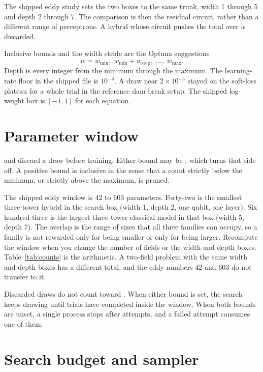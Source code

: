 The shipped eddy study sets the two boxes to the same trunk, width 1 through 5 and depth 2 through 7.
The comparison is then the residual circuit, rather than a different range of perceptrons.
A hybrid whose circuit pushes the total over  is discarded.

Inclusive bounds and the width stride are the Optuna suggestions
\[
w = w_{\min},\; w_{\min}+w_{\mathrm{step}},\; \ldots,\; w_{\max}.
\]
Depth is every integer from the minimum through the maximum.
The learning-rate floor in the shipped file is \(10^{-4}\).
A draw near \(2\times 10^{-5}\) stayed on the soft-loss plateau for a whole trial in the reference dam-break setup.
The shipped log-weight box is \([-1,1]\) for each equation.

\section{Parameter window}
\label{sec:window}

 and  discard a draw before training.
Either bound may be , which turns that side off.
A positive bound is inclusive in the sense that a count strictly below the minimum, or strictly above the maximum, is pruned.

The shipped eddy window is 42 to 603 parameters.
Forty-two is the smallest three-tower hybrid in the search box (width 1, depth 2, one qubit, one layer).
Six hundred three is the largest three-tower classical model in that box (width 5, depth 7).
The overlap is the range of sizes that all three families can occupy, so a family is not rewarded only for being smaller or only for being larger.
Recompute the window when you change the number of fields or the width and depth boxes.
Table~\ref{tab:counts} is the arithmetic.
A two-field problem with the same width and depth boxes has a different total, and the eddy numbers 42 and 603 do not transfer to it.

Discarded draws do not count toward .
When either bound is set, the search keeps drawing until  trials have completed inside the window.
When both bounds are unset, a single process stops after  attempts, and a failed attempt consumes one of them.

\section{Search budget and sampler}

